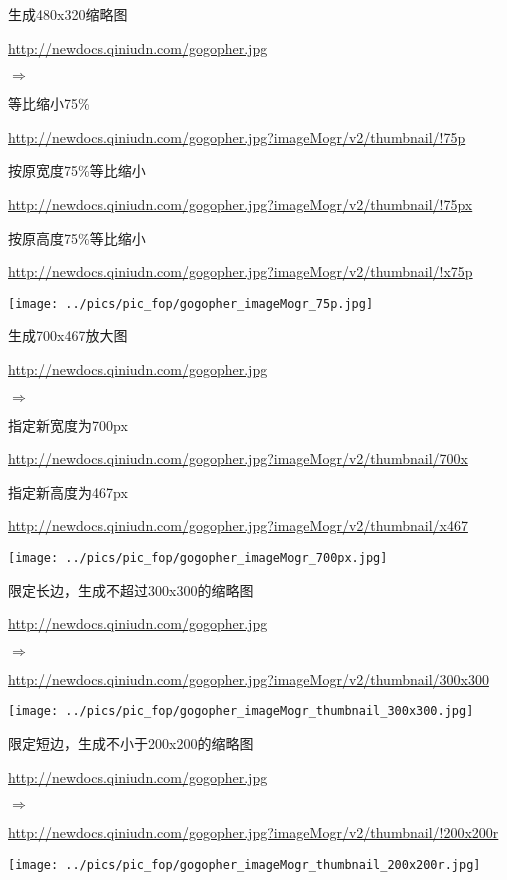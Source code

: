 \documentclass[11pt, oneside]{book}
\newcommand{\qhint}[1]{
\footnotesize
\vspace{0.2em}
\noindent
#1\par
\vspace{-0.5em}
\normalsize
}
\newcommand{\qsym}[1]{
\footnotesize
\noindent
#1\par
\normalsize
}
\newcommand{\qsamplelink}[1]{
\vspace{0.2em}
\noindent
#1\par
\vspace{0.1em}
}
\newcommand{\qurl}[1]{\footnotesize\url{#1}\normalsize}
\begin{document}
\begin{sample}
  \caption{生成480x320缩略图}
    \qsamplelink{\qurl{http://newdocs.qiniudn.com/gogopher.jpg}}
    \qsym{$\Rightarrow$}
    \qhint{等比缩小75\%}
    \qsamplelink{\qurl{http://newdocs.qiniudn.com/gogopher.jpg?imageMogr/v2/thumbnail/!75p}}
    \qhint{按原宽度75\%等比缩小}
    \qsamplelink{\qurl{http://newdocs.qiniudn.com/gogopher.jpg?imageMogr/v2/thumbnail/!75px}}
    \qhint{按原高度75\%等比缩小}
    \qsamplelink{\qurl{http://newdocs.qiniudn.com/gogopher.jpg?imageMogr/v2/thumbnail/!x75p}}

    \begin{center}
      \texttt{[image: ../pics/pic\_fop/gogopher\_imageMogr\_75p.jpg]}
    \end{center}
  \label{imageMogr-thumbnail-75p}
\end{sample}

\begin{sample}
  \caption{生成700x467放大图}
    \qsamplelink{\qurl{http://newdocs.qiniudn.com/gogopher.jpg}}
    \qsym{$\Rightarrow$}
    \qhint{指定新宽度为700px}
    \qsamplelink{\qurl{http://newdocs.qiniudn.com/gogopher.jpg?imageMogr/v2/thumbnail/700x}}
    \qhint{指定新高度为467px}
    \qsamplelink{\qurl{http://newdocs.qiniudn.com/gogopher.jpg?imageMogr/v2/thumbnail/x467}}

    \begin{center}
      \texttt{[image: ../pics/pic\_fop/gogopher\_imageMogr\_700px.jpg]}
    \end{center}
  \label{imageMogr-thumbnail-700px}
\end{sample}

\begin{sample}
  \caption{限定长边，生成不超过300x300的缩略图}
    \qsamplelink{\qurl{http://newdocs.qiniudn.com/gogopher.jpg}}
    \qsym{$\Rightarrow$}
    \qsamplelink{\qurl{http://newdocs.qiniudn.com/gogopher.jpg?imageMogr/v2/thumbnail/300x300}}

    \begin{center}
      \texttt{[image: ../pics/pic\_fop/gogopher\_imageMogr\_thumbnail\_300x300.jpg]}
    \end{center}
  \label{imageMogr-thumbnail-300x300}
\end{sample}

\begin{sample}
  \caption{限定短边，生成不小于200x200的缩略图}
    \qsamplelink{\qurl{http://newdocs.qiniudn.com/gogopher.jpg}}
    \qsym{$\Rightarrow$}
    \qsamplelink{\qurl{http://newdocs.qiniudn.com/gogopher.jpg?imageMogr/v2/thumbnail/!200x200r}}

    \begin{center}
      \texttt{[image: ../pics/pic\_fop/gogopher\_imageMogr\_thumbnail\_200x200r.jpg]}
    \end{center}
  \label{imageMogr-thumbnail-200x200r}
\end{sample}
\end{document}
